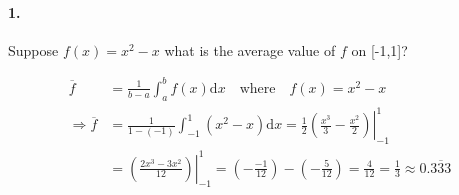 


\renewcommand\assignment{Homework Set I, Due Monday, January 23rd, 2023}



    \iffalse
    \begin{equation*}
        \begin{gathered}
            Equations go here.
        \end{gathered}
    \end{equation*}

    \resizebox{\hsize}{!}{$Long equation goes here$}

    \begin{multicol*}{# of columns}
    \end{multicol*}

    \horizontal

    \fi


    \paragraph*{1.}
    Suppose $f(x) = x^2-x$ what is the average value of $f$ on [-1,1]?

    \begin{mdframed}
        \begin{align*}
                \overline{f} & = \frac{1}{b-a} \int_{a}^{b}f(x)\mathrm{d}x \quad \text{where} \quad f(x) = x^2-x   \\
                \Rightarrow\overline{f} & = \frac{1}{1-(-1)} \int_{-1}^{1}(x^2-x)\mathrm{d}x = \frac{1}{2}\left.\left(\frac{x^3}{3}-\frac{x^2}{2}\right)\right|_{-1}^{1}   \\
                & = \left.\left(\frac{2x^3-3x^2}{12}\right)\right|_{-1}^{1} = \left(-\frac{-1}{12}\right) - \left(-\frac{5}{12}\right) = \frac{4}{12} = \boxed{\frac{1}{3} \approx 0.\overline{333}}
        \end{align*}
    \end{mdframed}

